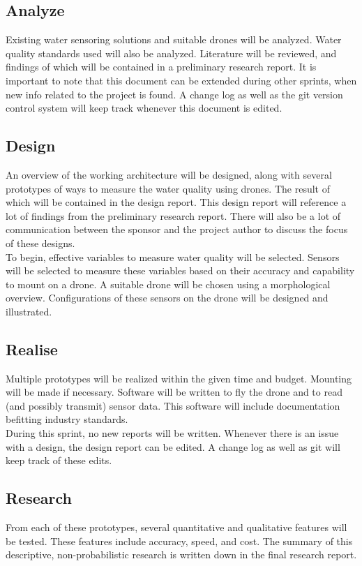 \documentclass[11pt, a4paper]{article}
\begin{document}
\subsection{Analyze} \label{sprint:analyze}
Existing water sensoring solutions and suitable drones will be analyzed. Water quality standards used will also be analyzed. Literature will be reviewed, and findings of which will be contained in a preliminary research report.  It is important to note that this document can be extended during other sprints, when new info related to the project is found. A change log as well as the git version control system \cite{git} will keep track whenever this document is edited.

\subsection{Design} \label{sprint:design}
An overview of the working architecture will be designed, along with several prototypes of ways to measure the water quality using drones. The result of which will be contained in the design report. This design report will reference a lot of findings from the preliminary research report. There will also be a lot of communication between the sponsor and the project author to discuss the focus of these designs. \\

To begin, effective variables to measure water quality will be selected. Sensors will be selected to measure these variables based on their accuracy and capability to mount on a drone. A suitable drone will be chosen using a morphological overview. Configurations of these sensors on the drone will be designed and illustrated. 

\subsection{Realise} \label{sprint:realise}
Multiple prototypes will be realized within the given time and budget. Mounting will be made if necessary. Software will be written to fly the drone and to read (and possibly transmit) sensor data. This software will include documentation befitting industry standards.\\

During this sprint, no new reports will be written. Whenever there is an issue with a design, the design report can be edited. A change log as well as git will keep track of these edits.

\subsection{Research}
From each of these prototypes, several quantitative and qualitative features will be tested. These features include accuracy, speed, and cost. The summary of this descriptive, non-probabilistic research is written down in the final research report.
\end{document}
